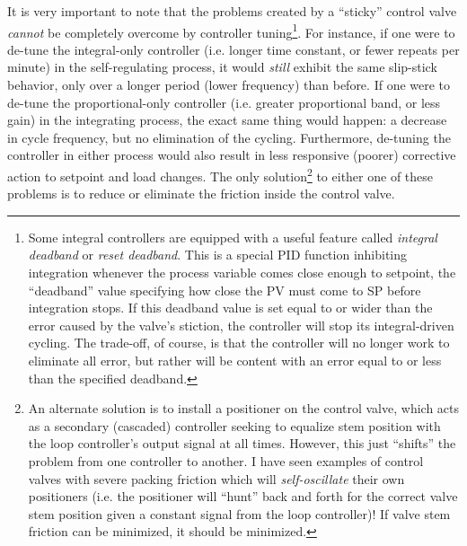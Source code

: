 \vskip 10pt

It is very important to note that the problems created by a ``sticky'' control valve \textit{cannot} be completely overcome by controller tuning\footnote{Some integral controllers are equipped with a useful feature called \textit{integral deadband} or \textit{reset deadband}.  This is a special PID function inhibiting integration whenever the process variable comes close enough to setpoint, the ``deadband'' value specifying how close the PV must come to SP before integration stops.  If this deadband value is set equal to or wider than the error caused by the valve's stiction, the controller will stop its integral-driven cycling.  The trade-off, of course, is that the controller will no longer work to eliminate all error, but rather will be content with an error equal to or less than the specified deadband.}.  For instance, if one were to de-tune the integral-only controller (i.e. longer time constant, or fewer repeats per minute) in the self-regulating process, it would \textit{still} exhibit the same slip-stick behavior, only over a longer period (lower frequency) than before.  If one were to de-tune the proportional-only controller (i.e. greater proportional band, or less gain) in the integrating process, the exact same thing would happen: a decrease in cycle frequency, but no elimination of the cycling.  Furthermore, de-tuning the controller in either process would also result in less responsive (poorer) corrective action to setpoint and load changes.  The only solution\footnote{An alternate solution is to install a positioner on the control valve, which acts as a secondary (cascaded) controller seeking to equalize stem position with the loop controller's output signal at all times.  However, this just ``shifts'' the problem from one controller to another.  I have seen examples of control valves with severe packing friction which will \textit{self-oscillate} their own positioners (i.e. the positioner will ``hunt'' back and forth for the correct valve stem position given a constant signal from the loop controller)!  If valve stem friction can be minimized, it should be minimized.} to either one of these problems is to reduce or eliminate the friction inside the control valve.        











